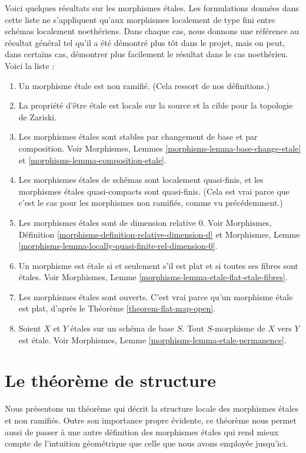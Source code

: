 \noindent
Voici quelques résultats sur les morphismes \'etales.
Les formulations données dans cette liste ne s'appliquent qu'aux
morphismes localement de type fini entre schémas localement noethériens.
Dans chaque cas, nous donnons une référence au résultat général tel qu'il a été
démontré plus tôt dans le projet, mais on peut, dans certains cas,
démontrer plus facilement le résultat dans le cas noethérien.
Voici la liste :
\begin{enumerate}
\item Un morphisme \'etale est non ramifié. (Cela ressort de nos définitions.)
\item La propriété d'être \'etale est locale sur la source et la cible pour la
topologie de Zariski.
\item Les morphismes \'etales sont stables par changement de base et par composition.
Voir Morphismes, Lemmes \ref{morphisms-lemma-base-change-etale}
et \ref{morphisms-lemma-composition-etale}.
\item Les morphismes \'etales de schémas sont localement quasi-finis,
et les morphismes \'etales quasi-compacts sont quasi-finis. (Cela est
vrai parce que c'est le cas pour les morphismes non ramifiés, comme vu précédemment.)
\item Les morphismes \'etales sont de dimension relative $0$. Voir
Morphismes, Définition \ref{morphisms-definition-relative-dimension-d}
et
Morphismes, Lemme \ref{morphisms-lemma-locally-quasi-finite-rel-dimension-0}.
\item Un morphisme est \'etale si et seulement s'il est plat et si
toutes ses fibres sont \'etales. Voir
Morphismes, Lemme \ref{morphisms-lemma-etale-flat-etale-fibres}.
\item Les morphismes \'etales sont ouverts. C'est vrai parce qu'un morphisme \'etale
est plat, d'après le Théorème \ref{theorem-flat-map-open}.
\item Soient $X$ et $Y$ \'etales sur un schéma de base $S$.
Tout $S$-morphisme de $X$ vers $Y$ est \'etale.
Voir Morphismes, Lemme \ref{morphisms-lemma-etale-permanence}.
\end{enumerate}






\section{Le théorème de structure}
\label{section-structure-etale-map}

\noindent
Nous présentons un théorème qui décrit la structure locale des morphismes \'etales
et non ramifiés. Outre son importance propre évidente,
ce théorème nous permet aussi de passer à une autre
définition des morphismes \'etales qui rend mieux compte de l'intuition géométrique
que celle que nous avons employée jusqu'ici.

